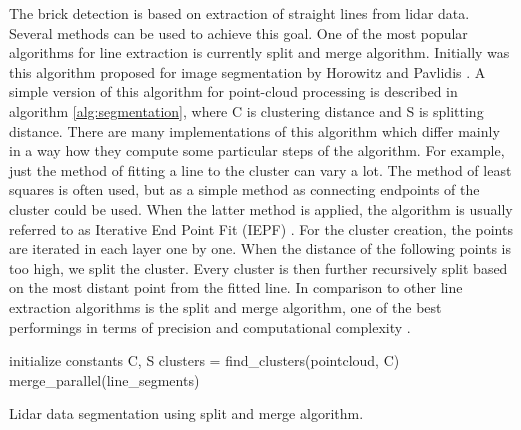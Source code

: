 The brick detection is based on extraction of straight lines from lidar data. Several methods can be used to achieve this goal. One of the most popular algorithms for line extraction is currently split and merge algorithm. Initially was this algorithm proposed for image segmentation by Horowitz and Pavlidis \cite{horowitz1976}. A simple version of this algorithm for point-cloud processing is described in algorithm \ref{alg:segmentation}, where C is clustering distance and S is splitting distance. There are many implementations of this algorithm which differ mainly in a way how they compute some particular steps of the algorithm. For example, just the method of fitting a line to the cluster can vary a lot. The method of least squares is often used, but as a simple method as connecting endpoints of the cluster could be used. When the latter method is applied, the algorithm is usually referred to as Iterative End Point Fit (IEPF) \cite{siadat1997}. For the cluster creation, the points are iterated in each layer one by one. When the distance of the following points is too high, we split the cluster. Every cluster is then further recursively split based on the most distant point from the fitted line. In comparison to other line extraction algorithms is the split and merge algorithm, one of the best performings in terms of precision and computational complexity \cite{nguyen2006}.
\begin{algorithm}[]
initialize constants C, S\;
  clusters = find\_clusters(pointcloud, C)\;
merge\_parallel(line\_segments)\;
 
 \caption{Lidar data segmentation using split and merge algorithm.}
 \label{alg:segmentation}
\end{algorithm}


